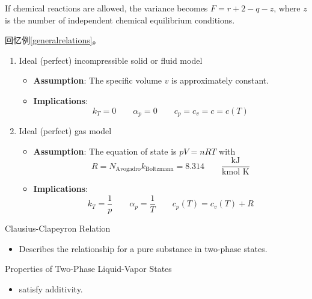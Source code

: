 \begin{add}
If chemical reactions are allowed, the variance becomes \( F = r + 2 - q - z \), where \( z \) is 
the number of independent chemical equilibrium conditions.
\end{add}
\begin{example}
    回忆例\ref{generalrelations}。
    \begin{enumerate}
        \item Ideal (perfect) incompressible solid or fluid model
        \begin{itemize}
            \item \textbf{Assumption}: The specific volume \( v \) is approximately constant.
            \item \textbf{Implications}:
            \[
            k_T = 0 \qquad \alpha_p = 0 \qquad c_p = c_v = c = c(T)
            \]
        \end{itemize}
        \item Ideal (perfect) gas model
        \begin{itemize}
            \item \textbf{Assumption}: The equation of state is \( pV = nRT \) with
            \[
            R = N_{\text{Avogadro}}k_{\text{Boltzmann}} = 8.314 \qquad \frac{\text{kJ}}{\text{kmol K}}
            \]
            \item \textbf{Implications}:
            \[
            k_T = \frac{1}{p} \qquad \alpha_p = \frac{1}{T} \qquad c_p(T) = c_v(T) + R
            \]
        \end{itemize}
    \end{enumerate}
\end{example}
\begin{example}
Clausius-Clapeyron Relation
\begin{itemize}
    \item Describes the relationship for a pure substance in two-phase states.
\end{itemize}
\end{example}
\begin{example}
Properties of Two-Phase Liquid-Vapor States
\begin{itemize}
    \item satisfy additivity.
\end{itemize}
\end{example}
